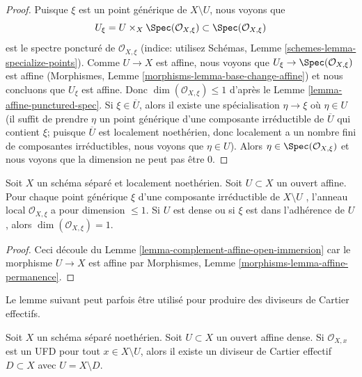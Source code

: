 \begin{proof}
Puisque  $\xi$  est un point générique de  $X \setminus U$, nous voyons que
$$
U_\xi = U \times_X \Spec(\mathcal{O}_{X, \xi}) \subset
\Spec(\mathcal{O}_{X, \xi})
$$
est le spectre poncturé de  $\mathcal{O}_{X, \xi}$  (indice: utilisez Schémas, Lemme
 \ref{schemes-lemma-specialize-points}). Comme  $U \to X$  est affine, nous voyons que  $U_\xi \to \Spec(\mathcal{O}_{X, \xi})$  est
affine (Morphismes, Lemme  \ref{morphisms-lemma-base-change-affine}) et nous concluons que  $U_\xi$  est
affine. Donc  $\dim(\mathcal{O}_{X, \xi}) \leq 1$  d'après le Lemme  \ref{lemma-affine-punctured-spec}. Si  $\xi \in \overline{U}$, alors il
existe une spécialisation  $\eta \to \xi$  où  $\eta \in U$  (il suffit de prendre
 $\eta$  un point générique d'une composante irréductible de  $\overline{U}$  qui
contient  $\xi$; puisque  $\overline{U}$  est localement noethérien, donc
localement a un nombre fini de composantes irréductibles, nous voyons que
 $\eta \in U$). Alors  $\eta \in \Spec(\mathcal{O}_{X, \xi})$  et nous voyons que la dimension ne peut pas être
 $0$.
\end{proof}

\begin{lemma}
\label{lemma-complement-affine-open}
Soit  $X$  un schéma séparé et localement noethérien. Soit  $U \subset X$  un
ouvert affine. Pour chaque point générique  $\xi$  d'une composante
irréductible de  $X \setminus U$ , l'anneau local  $\mathcal{O}_{X, \xi}$  a pour dimension
 $\leq 1$. Si  $U$  est dense ou si  $\xi$  est dans l'adhérence de
 $U$, alors  $\dim(\mathcal{O}_{X, \xi}) = 1$.
\end{lemma}

\begin{proof}
Ceci découle du Lemme  \ref{lemma-complement-affine-open-immersion}  car le morphisme  $U \to X$  est affine par
Morphismes, Lemme  \ref{morphisms-lemma-affine-permanence}.
\end{proof}

\noindent
Le lemme suivant peut parfois être utilisé pour produire des diviseurs de Cartier
effectifs.

\begin{lemma}
\label{lemma-complement-open-affine-effective-cartier-divisor}
Soit  $X$  un schéma séparé noethérien. Soit  $U \subset X$  un ouvert affine
dense. Si  $\mathcal{O}_{X, x}$  est un UFD pour tout  $x \in X \setminus U$, alors il existe un
diviseur de Cartier effectif  $D \subset X$  avec  $U = X \setminus D$.
\end{lemma}


